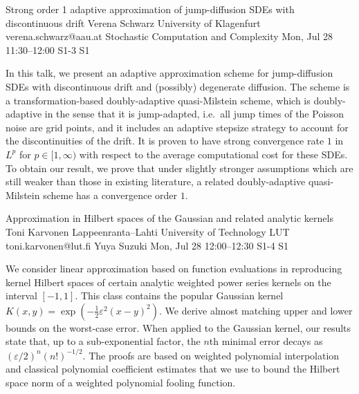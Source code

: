 \documentclass[12pt,lettersize,oneside]{book} %
\begin{document}
\begin{talk}
  {Strong order 1 adaptive approximation of jump-diffusion SDEs with discontinuous drift}%
  {Verena Schwarz}%
  {University of Klagenfurt}%
  {verena.schwarz@aau.at}%
  {Stochastic Computation and Complexity}%
  {}%
  {Mon, Jul 28 11:30--12:00}%
  {S1-3}%
  {S1}%
    

In this talk, we present an adaptive approximation scheme for jump-diffusion SDEs with discontinuous drift and (possibly) degenerate diffusion. The scheme is a transformation-based doubly-adaptive quasi-Milstein scheme, which 
is doubly-adaptive in the sense that it is jump-adapted, i.e.~all jump times of the Poisson noise are grid points, and it includes an adaptive stepsize strategy to account for the discontinuities of the drift. It is proven to have strong convergence rate $1$ in $L^p$ for $p\in[1,\infty)$ with respect to the average computational cost for these SDEs. 
To obtain our result, we prove that under slightly stronger assumptions which are still weaker than those in existing literature, a related doubly-adaptive quasi-Milstein scheme has a convergence order $1$. 
\end{talk}

\begin{talk}
  {Approximation in Hilbert spaces of the Gaussian and related analytic kernels}%
  {Toni Karvonen}%
  {Lappeenranta--Lahti University of Technology LUT}%
  {toni.karvonen@lut.fi}%
  {Yuya Suzuki}%
  {}%
  {Mon, Jul 28 12:00--12:30}%
  {S1-4}%
  {S1}%
  
    
   

\medskip

We consider linear approximation based on function evaluations in reproducing
kernel Hilbert spaces of certain analytic weighted power series kernels on the interval $[-1, 1]$. This class contains the popular Gaussian kernel $K(x, y) = \exp(-\frac{1}{2} \varepsilon^2(x-y)^2)$.
We derive almost matching upper and lower bounds on the worst-case error. When applied to
the Gaussian kernel, our results state that, up to a sub-exponential factor, the
$n$th minimal error decays as $(\varepsilon/2)^n (n!)^{-1/2}$. The proofs are based on weighted
polynomial interpolation and classical polynomial coefficient estimates that we use
to bound the Hilbert space norm of a weighted polynomial fooling function.
\end{talk}
\end{document}
